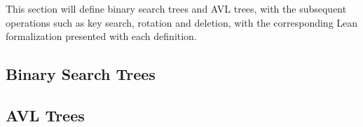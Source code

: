 This section will define binary search trees and AVL trees, with the subsequent operations such as key search, rotation and deletion, with the corresponding Lean formalization presented with each definition.

\subsection{Binary Search Trees}


\subsection{AVL Trees}
